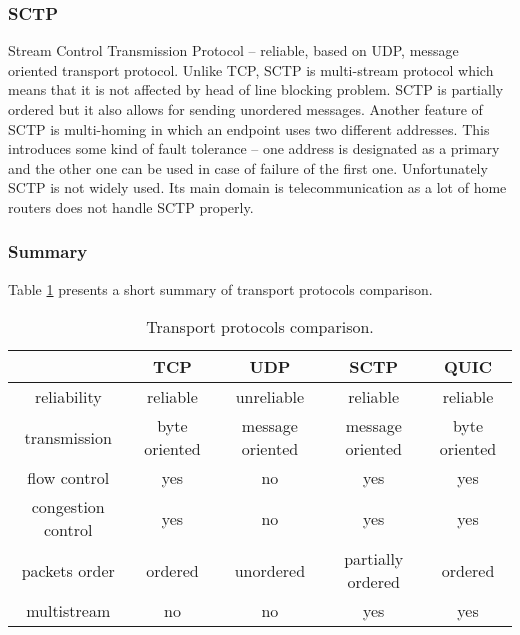 \subsubsection{SCTP}
Stream Control Transmission Protocol -- reliable, based on UDP, message oriented transport protocol.
Unlike TCP, SCTP is multi-stream protocol which means that it is not affected by head of line blocking problem. 
SCTP is partially ordered but it also allows for sending unordered messages. 
Another feature of SCTP is multi-homing in which an endpoint uses two different addresses. 
This introduces some kind of fault tolerance -- one address is designated as a primary and the other one can be used in case of failure of the first one.
Unfortunately SCTP is not widely used.
Its main domain is telecommunication as a lot of home routers does not handle SCTP properly.

\subsubsection{Summary}
Table \ref{tab:protocols_comparision} presents a short summary of transport protocols comparison.
\begin{table}[h]
\centering
\begin{tabular}{|c | c | c | c | c |} 
    \hline
    & TCP & UDP & SCTP & QUIC \\  
    \hline
    reliability & reliable & unreliable & reliable & reliable \\
    \hline
    transmission & byte oriented & message oriented & message oriented & byte oriented \\
    \hline
    flow control & yes & no & yes & yes \\
    \hline
    congestion control & yes & no & yes & yes \\
    \hline
    packets order & ordered & unordered & partially ordered & ordered \\
    \hline
    multistream & no & no & yes & yes \\
    \hline
\end{tabular}
\caption{\label{tab:protocols_comparision}Transport protocols comparison.}
\end{table}
